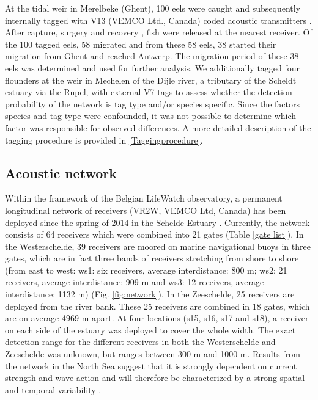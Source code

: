 \documentclass[preprint,12pt,authoryear]{elsarticle}
\begin{document}
\begin{spacing}{1.9}
At the tidal weir in Merelbeke (Ghent), 100 eels were caught and subsequently internally tagged with V13 (VEMCO Ltd., Canada) coded acoustic transmitters \citep{Verhelst2018}. After capture, surgery and recovery \citep{Thorstad2013b}, fish were released at the nearest receiver. Of the 100 tagged eels, 58 migrated and from these 58 eels, 38 started their migration from Ghent and reached Antwerp. The migration period of these 38 eels was determined \citep{Verhelst2018} and used for further analysis. We additionally tagged four flounders at the weir in Mechelen of the Dijle river, a tributary of the Scheldt estuary via the Rupel, with external V7 tags to assess whether the detection probability of the network is tag type and/or species specific. Since the factors species and tag type were confounded, it was not possible to determine which factor was responsible for observed differences. A more detailed description of the tagging procedure is provided in \ref{Taggingprocedure}.  

\subsection{Acoustic network}

Within the framework of the Belgian LifeWatch observatory, a permanent longitudinal network of receivers (VR2W, VEMCO Ltd, Canada) has been deployed since the spring of 2014 in the Schelde Estuary \citep{Reubens2019TheNetwork}. Currently, the network consists of 64 receivers which were combined into 21 gates (Table \ref{gate list}). In the Westerschelde, 39 receivers are moored on marine navigational buoys in three gates, which are in fact three bands of receivers stretching from shore to shore (from east to west: ws1: six receivers, average interdistance: 800 m; ws2: 21 receivers, average interdistance: 909 m and ws3: 12 receivers, average interdistance: 1132 m) (Fig. \ref{fig:network}). In the Zeeschelde, 25 receivers are deployed from the river bank. These 25 receivers are combined in 18 gates, which are on average 4969 m apart. At four locations (s15, s16, s17 and s18), a receiver on each side of the estuary was deployed to cover the whole width. The exact detection range for the different receivers in both the Westerschelde and Zeeschelde was unknown, but ranges between 300 m and 1000 m. Results from the network in the North Sea suggest that it is strongly dependent on current strength and wave action and will therefore be characterized by a strong spatial and temporal variability \citep{Reubens2018}.


\end{spacing}
\end{document}
